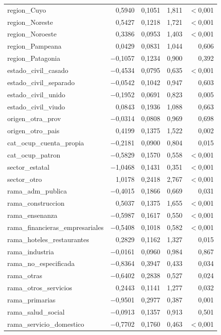 \begin{longtable}{lrrrr}
region\_Cuyo & 0,5940 & 0,1051 & 1,811 & $<$0,001 \\
region\_Noreste & 0,5427 & 0,1218 & 1,721 & $<$0,001 \\
region\_Noroeste & 0,3386 & 0,0953 & 1,403 & $<$0,001 \\
region\_Pampeana & 0,0429 & 0,0831 & 1,044 & 0,606 \\
region\_Patagonia & $-$0,1057 & 0,1234 & 0,900 & 0,392 \\
estado\_civil\_casado & $-$0,4534 & 0,0795 & 0,635 & $<$0,001 \\
estado\_civil\_separado & $-$0,0542 & 0,1042 & 0,947 & 0,603 \\
estado\_civil\_unido & $-$0,1952 & 0,0691 & 0,823 & 0,005 \\
estado\_civil\_viudo & 0,0843 & 0,1936 & 1,088 & 0,663 \\
origen\_otra\_prov & $-$0,0314 & 0,0808 & 0,969 & 0,698 \\
origen\_otro\_pais & 0,4199 & 0,1375 & 1,522 & 0,002 \\
cat\_ocup\_cuenta\_propia & $-$0,2181 & 0,0900 & 0,804 & 0,015 \\
cat\_ocup\_patron & $-$0,5829 & 0,1570 & 0,558 & $<$0,001 \\
sector\_estatal & $-$1,0468 & 0,1431 & 0,351 & $<$0,001 \\
sector\_otro & 1,0178 & 0,2418 & 2,767 & $<$0,001 \\
rama\_adm\_publica & $-$0,4015 & 0,1866 & 0,669 & 0,031 \\
rama\_construccion & 0,5037 & 0,1375 & 1,655 & $<$0,001 \\
rama\_ensenanza & $-$0,5987 & 0,1617 & 0,550 & $<$0,001 \\
rama\_financieras\_empresariales & $-$0,5408 & 0,1018 & 0,582 & $<$0,001 \\
rama\_hoteles\_restaurantes & 0,2829 & 0,1162 & 1,327 & 0,015 \\
rama\_industria & $-$0,0161 & 0,0960 & 0,984 & 0,867 \\
rama\_no\_especificada & $-$0,8364 & 0,3947 & 0,433 & 0,034 \\
rama\_otras & $-$0,6402 & 0,2838 & 0,527 & 0,024 \\
rama\_otros\_servicios & 0,2443 & 0,1141 & 1,277 & 0,032 \\
rama\_primarias & $-$0,9501 & 0,2977 & 0,387 & 0,001 \\
rama\_salud\_social & $-$0,0913 & 0,1357 & 0,913 & 0,501 \\
rama\_servicio\_domestico & $-$0,7702 & 0,1760 & 0,463 & $<$0,001 \\

\end{longtable}
